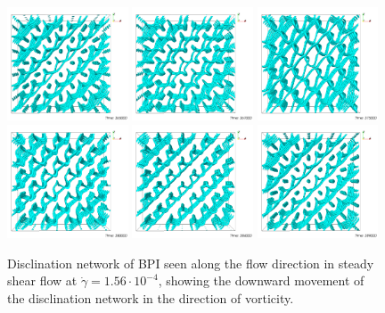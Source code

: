 \documentclass[aps,pre,twocolumn,groupedaddress]{revtex4-1}
\begin{document}
\begin{figure}[h]
\includegraphics[width=0.32\textwidth]{disc-365k_run914.png}
\includegraphics[width=0.32\textwidth]{disc-367k_run914.png}
\includegraphics[width=0.32\textwidth]{disc-375k_run914.png}\\
\includegraphics[width=0.32\textwidth]{disc-380k_run914.png}
\includegraphics[width=0.32\textwidth]{disc-384k_run914.png}
\includegraphics[width=0.32\textwidth]{disc-389k_run914.png}
\caption{Disclination network of BPI seen along the flow direction in steady shear flow at $\dot{\gamma}=1.56\cdot 10^{-4}$, showing the downward movement of the disclination network in the direction of vorticity.}
\caption{\label{fig6}}
\end{figure}
\end{document}

